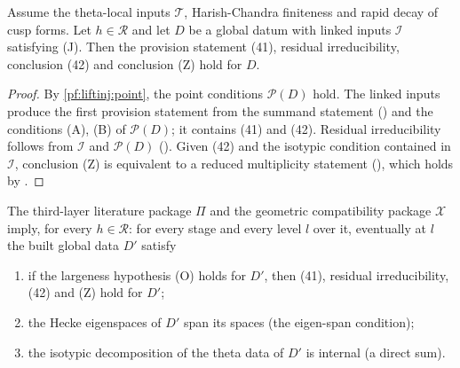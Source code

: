 \begin{lemma}\label{pf:liftinj:ptaux}
Assume the theta-local inputs $\mathcal T$, Harish-Chandra finiteness and rapid decay of cusp forms. Let $h\in\mathcal R$ and let $D$ be a global datum with
linked inputs $\mathcal I$ satisfying (J). Then the provision statement (41), residual irreducibility, conclusion (42) and conclusion (Z) hold for $D$.
\end{lemma}

\begin{proof}
By \cref{pf:liftinj:point}, the point conditions $\mathcal P(D)$ hold. The linked inputs produce the first provision statement from the summand statement
() and the conditions (A), (B) of $\mathcal P(D)$; it contains (41) and (42). Residual irreducibility follows from
$\mathcal I$ and $\mathcal P(D)$ (). Given (42) and the isotypic
condition contained in $\mathcal I$, conclusion (Z) is equivalent to a reduced multiplicity statement
(), which holds by
.
\end{proof}

\begin{theorem}\label{pf:liftinj:ptst}
The third-layer literature package $\Pi$ and the geometric compatibility package $\mathcal X$ imply, for every $h\in\mathcal R$: for every stage and every level
$l$ over it, eventually at $l$ the built global data $D'$ satisfy
\begin{enumerate}[label=(\roman*)]
\item if the largeness hypothesis (O) holds for $D'$, then (41), residual irreducibility, (42) and (Z) hold for $D'$;
\item the Hecke eigenspaces of $D'$ span its spaces (the eigen-span condition);
\item the isotypic decomposition of the theta data of $D'$ is internal (a direct sum).
\end{enumerate}
\end{theorem}


